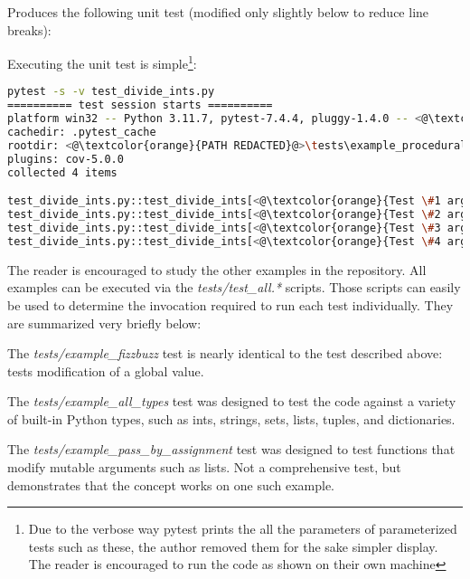 Produces the following unit test (modified only slightly below to reduce line
 breaks):



Executing the unit test is simple\footnote{Due to the verbose way pytest prints the 
all the parameters of  parameterized tests such as these, the author removed
them for the sake simpler display.  The reader is encouraged to run the code 
as shown on their own machine}:

\begin{lstlisting}[language=bash]
pytest -s -v test_divide_ints.py
========== test session starts ==========
platform win32 -- Python 3.11.7, pytest-7.4.4, pluggy-1.4.0 -- <@\textcolor{orange}{PATH REDACTED}@>\.venv\Scripts\python.exe
cachedir: .pytest_cache
rootdir: <@\textcolor{orange}{PATH REDACTED}@>\tests\example_procedural_division
plugins: cov-5.0.0
collected 4 items

test_divide_ints.py::test_divide_ints[<@\textcolor{orange}{Test \#1 arguments SNIPPED}@>] <@\textcolor{green}{PASSED}@>
test_divide_ints.py::test_divide_ints[<@\textcolor{orange}{Test \#2 arguments SNIPPED}@>] <@\textcolor{green}{PASSED}@>
test_divide_ints.py::test_divide_ints[<@\textcolor{orange}{Test \#3 arguments SNIPPED}@>] <@\textcolor{green}{PASSED}@>
test_divide_ints.py::test_divide_ints[<@\textcolor{orange}{Test \#4 arguments SNIPPED}@>] <@\textcolor{green}{PASSED}@>
\end{lstlisting}

The reader is encouraged to study the other examples in the repository.
All examples can be executed via the 
\textit{tests/test\_all.*} scripts.  Those
scripts can easily be used to determine the invocation required to run each 
test individually.  They are summarized very briefly below:

The \textit{tests/example\_fizzbuzz} test is nearly identical to the 
test described above: tests modification of a global value.

The \textit{tests/example\_all\_types} test was designed to test
the code against a variety of built-in Python types, 
such as ints, strings, sets, lists, tuples, and dictionaries.

The \textit{tests/example\_pass\_by\_assignment} test was designed to test
functions that modify mutable arguments such as lists. Not a comprehensive test,
but demonstrates that the concept works on one such example.

